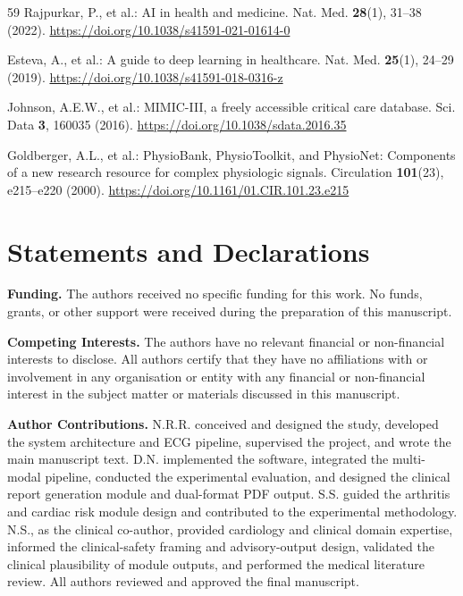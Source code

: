 \documentclass[AMA,STIX1COL,]{WileyNJD-v2}
\begin{document}
\begin{thebibliography}{59}
Rajpurkar, P., et al.: AI in health and medicine. Nat. Med. \textbf{28}(1), 31--38 (2022). \url{https://doi.org/10.1038/s41591-021-01614-0}

Esteva, A., et al.: A guide to deep learning in healthcare. Nat. Med. \textbf{25}(1), 24--29 (2019). \url{https://doi.org/10.1038/s41591-018-0316-z}

Johnson, A.E.W., et al.: MIMIC-III, a freely accessible critical care database. Sci. Data \textbf{3}, 160035 (2016). \url{https://doi.org/10.1038/sdata.2016.35}

Goldberger, A.L., et al.: PhysioBank, PhysioToolkit, and PhysioNet: Components of a new research resource for complex physiologic signals. Circulation \textbf{101}(23), e215--e220 (2000). \url{https://doi.org/10.1161/01.CIR.101.23.e215}

\end{thebibliography}

\section*{Statements and Declarations}

\textbf{Funding.} The authors received no specific funding for this work. No funds, grants, or other support were received during the preparation of this manuscript.

\textbf{Competing Interests.} The authors have no relevant financial or non-financial interests to disclose. All authors certify that they have no affiliations with or involvement in any organisation or entity with any financial or non-financial interest in the subject matter or materials discussed in this manuscript.

\textbf{Author Contributions.}
N.R.R. conceived and designed the study, developed the system architecture and ECG pipeline, supervised the project, and wrote the main manuscript text.
D.N. implemented the software, integrated the multi-modal pipeline, conducted the experimental evaluation, and designed the clinical report generation module and dual-format PDF output.
S.S. guided the arthritis and cardiac risk module design and contributed to the experimental methodology.
N.S., as the clinical co-author, provided cardiology and clinical domain expertise, informed the clinical-safety framing and advisory-output design, validated the clinical plausibility of module outputs, and performed the medical literature review.
All authors reviewed and approved the final manuscript.
\end{document}
